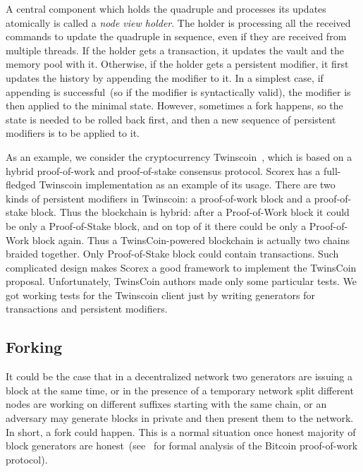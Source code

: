 A central component which holds the quadruple {\em <history, minimal state, vault, memory pool>} and processes its updates atomically is called a {\em node view holder}. The holder is processing all the received commands to update the quadruple in sequence, even if they are received from multiple threads. If the holder gets a transaction, it updates the vault and the memory pool with it. Otherwise, if the holder gets a persistent modifier, it first updates the history by appending the modifier to it. In a simplest case, if appending is successful~(so if the modifier is syntactically valid), the modifier is then applied to the minimal state. However, sometimes a fork happens, so the state is needed to be rolled back first, and then a new sequence of persistent modifiers is to be applied to it. 

As an example, we consider the cryptocurrency Twinscoin~\cite{cryptoeprint:2017:232}, which is based on a hybrid proof-of-work and proof-of-stake consensus protocol. Scorex has a full-fledged Twinscoin implementation as an example of its usage. There are two kinds of persistent modifiers in Twinscoin: a proof-of-work block and a proof-of-stake block. Thus the blockchain is hybrid: after a Proof-of-Work block it could be only a Proof-of-Stake block, and on top of it there could be only a Proof-of-Work block again. Thus a TwinsCoin-powered blockchain is actually two chains braided together. Only Proof-of-Stake block could contain transactions. Such complicated design makes Scorex a good framework to implement the TwinsCoin proposal. Unfortunately, TwinsCoin authors made only some particular tests. We got working tests for the Twinscoin client just by writing generators for transactions and persistent modifiers.

\subsection{Forking}
\label{sec:forking}

It could be the case that in a decentralized network two generators are issuing a block at the same time, or in the presence of a temporary network split different nodes are working on different suffixes starting with the same chain, or an adversary may generate blocks in private and then present them to the network. In short, a fork could happen. This is a normal situation once honest majority of block generators are honest~(see~\cite{Garay2015} for formal analysis of the Bitcoin proof-of-work protocol).    

